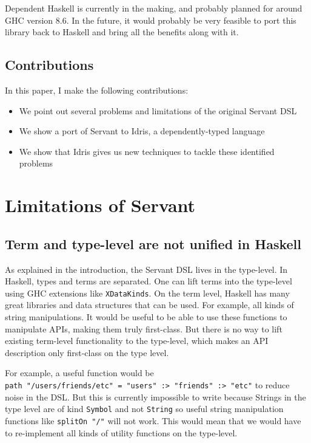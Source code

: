 \documentclass[12pt,a4paper]{article}
\begin{document}
Dependent Haskell is currently in the making, and probably planned for around GHC version 8.6. In the future, it would probably be very feasible to port this library back to Haskell and bring all the benefits along with it.

\subsection{Contributions}
In this paper, I make the following contributions:

\begin{itemize}
  \item We point out several problems and limitations of the original Servant DSL
  \item We show a port of Servant to Idris, a dependently-typed language
  \item We show that Idris gives us new techniques to tackle these identified problems
\end{itemize}

\section{Limitations of Servant}\label{sec:issues}
\subsection{Term and type-level are not unified in Haskell}
As explained in the introduction, the Servant DSL lives in the type-level. In Haskell, types and terms are separated. One can lift terms into the type-level using GHC extensions like \texttt{XDataKinds}.  On the term level, Haskell has many great libraries and data structures that can be used. For example, all kinds of string manipulations. It would be useful to be able to use these functions to manipulate APIs, making them truly first-class. But there is no way to lift existing term-level functionality to the type-level, which makes an API description only first-class on the type level.

For example, a useful function would be \\ \texttt{path "/users/friends/etc" = "users" :> "friends" :> "etc"} to reduce noise in the DSL\@. But this is currently impossible to write because Strings in the type level are of kind \texttt{Symbol} and not \texttt{String} so useful string manipulation functions like \texttt{splitOn "/"} will not work. This would mean that we would have to re-implement all kinds of utility functions on the type-level.
\end{document}
